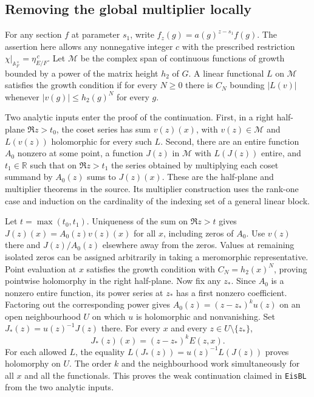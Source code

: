 \subsection{Removing the global multiplier locally}

For any section \(f\) at parameter \(s_1\), write
\(f_z(g)=a(g)^{z-s_1}f(g)\). The assertion here allows any
nonnegative integer \(c\) with the prescribed restriction
\(\chi|_{\mathbb A_F^\times}=\eta_{E/F}^{\,c}\). Let \(\mathcal M\)
be the complex span of continuous functions of growth bounded by a
power of the matrix height \(h_2\) of \(G\). A linear functional
\(L\) on \(\mathcal M\) satisfies the growth condition if for every
\(N\geq0\) there is \(C_N\) bounding \(|L(v)|\) whenever
\(|v(g)|\leq h_2(g)^N\) for every \(g\).

Two analytic inputs enter the proof of the continuation.
First, in a right half-plane \(\Re z>t_0\), the coset series has
sum \(v(z)(x)\), with \(v(z)\in\mathcal M\) and \(L(v(z))\)
holomorphic for every such \(L\). Second, there are an entire
function \(A_0\) nonzero at some point, a function \(J(z)\) in
\(\mathcal M\) with \(L(J(z))\) entire, and \(t_1\in\mathbb R\)
such that on \(\Re z>t_1\) the series obtained by multiplying
each coset summand by \(A_0(z)\) sums to \(J(z)(x)\). These are
the half-plane and multiplier theorems in the source. Its
multiplier construction uses the rank-one case and induction on
the cardinality of the indexing set of a general linear block.

Let \(t=\max(t_0,t_1)\). Uniqueness of the sum on \(\Re z>t\)
gives \(J(z)(x)=A_0(z)v(z)(x)\) for all \(x\), including zeros
of \(A_0\). Use \(v(z)\) there and \(J(z)/A_0(z)\) elsewhere
away from the zeros. Values at remaining isolated zeros can be
assigned arbitrarily in taking a meromorphic representative.
Point evaluation at \(x\) satisfies the growth condition with
\(C_N=h_2(x)^N\), proving pointwise holomorphy in the right
half-plane. Now fix any \(z_*\). Since \(A_0\) is a nonzero
entire function, its power series at \(z_*\) has a first
nonzero coefficient. Factoring out the corresponding power gives
\(A_0(z)=(z-z_*)^k u(z)\) on an open neighbourhood \(U\) on
which \(u\) is holomorphic and nonvanishing. Set
\(J_*(z)=u(z)^{-1}J(z)\) there. For every \(x\) and every
\(z\in U\setminus\{z_*\}\),
\[
                  J_*(z)(x)=(z-z_*)^k E(z,x).
\]
For each allowed \(L\), the equality
\(L(J_*(z))=u(z)^{-1}L(J(z))\) proves holomorphy on \(U\).
The order \(k\) and the neighbourhood work simultaneously for
all \(x\) and all the functionals. This proves the weak
continuation claimed in \texttt{EisBL} from the two analytic
inputs.

